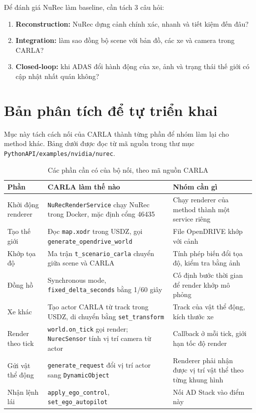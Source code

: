 Để đánh giá NuRec làm baseline, cần tách 3 câu hỏi:
\begin{enumerate}
  \item \textbf{Reconstruction:} NuRec dựng cảnh chính xác, nhanh và tiết kiệm đến đâu?
  \item \textbf{Integration:} làm sao đồng bộ scene với bản đồ, các xe và camera trong CARLA?
  \item \textbf{Closed-loop:} khi ADAS đổi hành động của xe, ảnh và trạng thái thế giới có cập nhật nhất quán không?
\end{enumerate}

\section{Bản phân tích để tự triển khai}

Mục này tách cách nối của CARLA thành từng phần để nhóm làm lại cho method khác.
Bảng dưới được đọc từ mã nguồn trong thư mục \texttt{PythonAPI/examples/nvidia/nurec}.

\begin{table}[H]
  \centering
  \small
  \caption{Các phần cần có của bộ nối, theo mã nguồn CARLA}
  \begin{tabularx}{\linewidth}{>{\raggedright\arraybackslash}p{2.7cm} >{\raggedright\arraybackslash}X >{\raggedright\arraybackslash}X}
    \toprule
    \textbf{Phần} & \textbf{CARLA làm thế nào} & \textbf{Nhóm cần gì} \\
    \midrule
    Khởi động renderer & \texttt{NuRecRenderService} chạy NuRec trong Docker, mặc định cổng 46435 & Chạy renderer của method thành một service riêng \\
    \addlinespace
    Tạo thế giới & Đọc \texttt{map.xodr} trong USDZ, gọi \texttt{generate\_opendrive\_world} & File OpenDRIVE khớp với cảnh \\
    \addlinespace
    Khớp tọa độ & Ma trận \texttt{t\_scenario\_carla} chuyển giữa scene và CARLA & Tính phép biến đổi tọa độ, kiểm tra bằng ảnh \\
    \addlinespace
    Đồng hồ & Synchronous mode, \texttt{fixed\_delta\_seconds} bằng 1/60 giây & Cố định bước thời gian để render khớp mô phỏng \\
    \addlinespace
    Xe khác & Tạo actor CARLA từ track trong USDZ, di chuyển bằng \texttt{set\_transform} & Track của vật thể động, kích thước xe \\
    \addlinespace
    Render theo tick & \texttt{world.on\_tick} gọi render; \texttt{NurecSensor} tính vị trí camera từ actor & Callback ở mỗi tick, giới hạn tốc độ render \\
    \addlinespace
    Gửi vật thể động & \texttt{generate\_request} đổi vị trí actor sang \texttt{DynamicObject} & Renderer phải nhận được vị trí vật thể theo từng khung hình \\
    \addlinespace
    Nhận lệnh lái & \texttt{apply\_ego\_control}, \texttt{set\_ego\_autopilot} & Nối AD Stack vào điểm này \\
    \bottomrule
  \end{tabularx}
\end{table}

